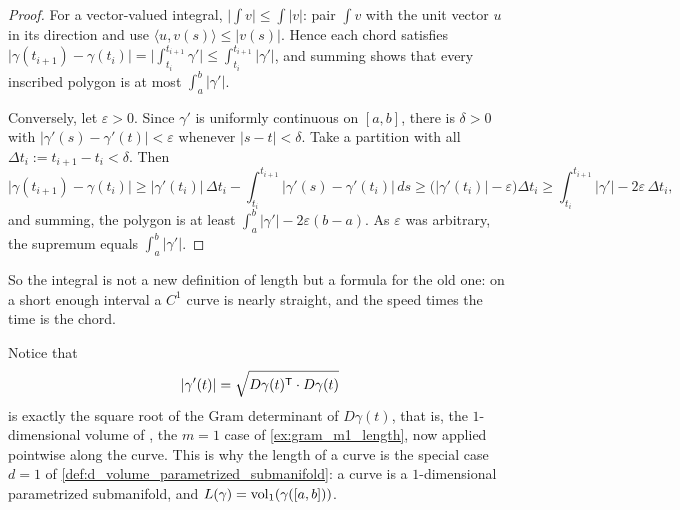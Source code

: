 \begin{proof}
For a vector-valued integral, $\big\lvert\int v\big\rvert \leq \int\lvert v\rvert$: pair
$\int v$ with the unit vector $u$ in its direction and use $\langle u, v(s)\rangle \leq
\lvert v(s)\rvert$. Hence each chord satisfies
$\lvert\gamma(t_{i+1})-\gamma(t_i)\rvert = \big\lvert\int_{t_i}^{t_{i+1}}\gamma'\big\rvert \leq
\int_{t_i}^{t_{i+1}}\lvert\gamma'\rvert$, and summing shows that every inscribed polygon is at
most $\int_a^b\lvert\gamma'\rvert$.

Conversely, let $\varepsilon > 0$. Since $\gamma'$ is uniformly continuous on $[a,b]$, there is
$\delta > 0$ with $\lvert\gamma'(s)-\gamma'(t)\rvert < \varepsilon$ whenever
$\lvert s-t\rvert < \delta$. Take a partition with all $\Delta t_i := t_{i+1}-t_i < \delta$. Then
\[\lvert\gamma(t_{i+1})-\gamma(t_i)\rvert
  \geq \lvert\gamma'(t_i)\rvert\,\Delta t_i
       - \int_{t_i}^{t_{i+1}}\lvert\gamma'(s)-\gamma'(t_i)\rvert\,ds
  \geq \big(\lvert\gamma'(t_i)\rvert - \varepsilon\big)\Delta t_i
  \geq \int_{t_i}^{t_{i+1}}\lvert\gamma'\rvert - 2\varepsilon\,\Delta t_i ,\]
and summing, the polygon is at least $\int_a^b\lvert\gamma'\rvert - 2\varepsilon(b-a)$. As
$\varepsilon$ was arbitrary, the supremum equals $\int_a^b\lvert\gamma'\rvert$.
\end{proof}

So the integral is not a new definition of length but a formula for the old one: on a short
enough interval a $C^1$ curve is nearly straight, and the speed times the time is the chord.

\begin{remark}
Notice that
\[\lvert\gamma'(t)\rvert = \sqrt{D\gamma(t)^{\mathsf{T}} \cdot D\gamma(t)}\]
is exactly the square root of the Gram determinant of $D\gamma(t)$, that is, the
$1$-dimensional volume of , the $m=1$ case of
\cref{ex:gram_m1_length}, now applied
pointwise along the curve. This is why the length of a curve is the special case
$d=1$ of \cref{def:d_volume_parametrized_submanifold}: a curve is a $1$-dimensional
parametrized submanifold, and $L(\gamma) = \operatorname{vol}_1(\gamma([a,b]))$.
\end{remark}

